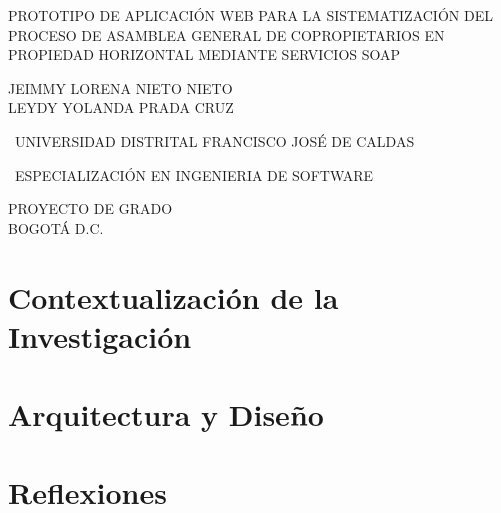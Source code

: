 \documentclass[letter,12pt,openany]{book}
\begin{document}
\begin{titlepage}
	\centering	
	{\scshape\LARGE PROTOTIPO DE APLICACIÓN WEB PARA LA SISTEMATIZACIÓN DEL PROCESO DE ASAMBLEA GENERAL DE COPROPIETARIOS EN PROPIEDAD HORIZONTAL MEDIANTE SERVICIOS SOAP \par}
	\vspace{4cm}
	{\scshape\Large JEIMMY LORENA NIETO NIETO\\
		LEYDY YOLANDA PRADA CRUZ\par}
	\vspace{4.5cm}
	
	{\Large\ UNIVERSIDAD DISTRITAL FRANCISCO JOSÉ DE CALDAS\par}
	{\Large\ ESPECIALIZACIÓN EN INGENIERIA DE SOFTWARE\par}
    PROYECTO DE GRADO \\
	BOGOTÁ D.C.
	
	\vfill
	
	\vfill
	
\end{titlepage}

\frontmatter
\tableofcontents
\listoftables
\listoffigures

\mainmatter

\part{Contextualización de la Investigación}

\part{Arquitectura y Diseño}








\part{Reflexiones}


%


\backmatter


\end{document}
